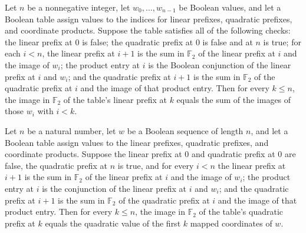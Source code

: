 \begin{theorem}
\label{FABL.completeQuadraticLinearPrefixProof_eq_of_checks}
\leanok
{}
Let $n$ be a nonnegative integer, let $w_0,\ldots,w_{n-1}$ be Boolean values, and
let a Boolean table assign values to the indices for linear prefixes, quadratic
prefixes, and coordinate products. Suppose the table satisfies all of the following
checks: the linear prefix at $0$ is false; the quadratic prefix at $0$ is false and at
$n$ is true; for each $i<n$, the linear prefix at $i+1$ is the sum in $\mathbb F_2$ of
the linear prefix at $i$ and the image of $w_i$; the product entry at $i$ is the Boolean
conjunction of the linear prefix at $i$ and $w_i$; and the quadratic prefix at $i+1$ is
the sum in $\mathbb F_2$ of the quadratic prefix at $i$ and the image of that product
entry. Then for every $k\le n$, the image in $\mathbb F_2$ of the table's linear prefix
at $k$ equals the sum of the images of those $w_i$ with $i<k$.
\end{theorem}

\begin{theorem}
\label{FABL.completeQuadraticPrefixProof_eq_of_checks}
\leanok
{}
Let $n$ be a natural number, let $w$ be a Boolean sequence of length $n$, and let a
Boolean table assign values to the linear prefixes, quadratic prefixes, and coordinate
products. Suppose the linear prefix at $0$ and quadratic prefix at $0$ are false, the
quadratic prefix at $n$ is true, and for every $i<n$ the linear prefix at $i+1$ is the
sum in $\mathbb F_2$ of the linear prefix at $i$ and the image of $w_i$; the product
entry at $i$ is the conjunction of the linear prefix at $i$ and $w_i$; and the quadratic
prefix at $i+1$ is the sum in $\mathbb F_2$ of the quadratic prefix at $i$ and the image
of that product entry. Then for every $k\le n$, the image in $\mathbb F_2$ of the
table's quadratic prefix at $k$ equals the quadratic value of the first $k$ mapped
coordinates of $w$.
\end{theorem}

